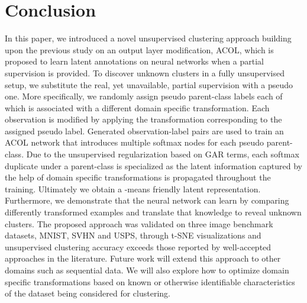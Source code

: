 \documentclass{article} \usepackage{iclr2018_conference,times}
\begin{document}
\section{Conclusion}

In this paper, we introduced a novel unsupervised clustering approach building upon the previous study on an output layer modification, ACOL, which is proposed to learn latent annotations on neural networks when a partial supervision is provided. To discover unknown clusters in a fully unsupervised setup, we substitute the real, yet unavailable, partial supervision with a pseudo one. More specifically, we randomly assign pseudo parent-class labels each of which is associated with a different domain specific transformation. Each observation is modified by applying the transformation corresponding to the assigned pseudo label. Generated observation-label pairs are used to train an ACOL network that introduces multiple softmax nodes for each pseudo parent-class. Due to the unsupervised regularization based on GAR terms, each softmax duplicate under a parent-class is specialized as the latent information captured by the help of domain specific transformations is propagated throughout the training. Ultimately we obtain a -means friendly latent representation. Furthermore, we demonstrate that the neural network can learn by comparing differently transformed examples and translate that knowledge to reveal unknown clusters. The proposed approach was validated on three image benchmark datasets, MNIST, SVHN and USPS, through t-SNE visualizations and unsupervised clustering accuracy exceeds those reported by well-accepted approaches in the literature. Future work will extend this approach to other domains such as sequential data. We will also explore how to optimize domain specific transformations based on known or otherwise identifiable characteristics of the dataset being considered for clustering.



\end{document}
